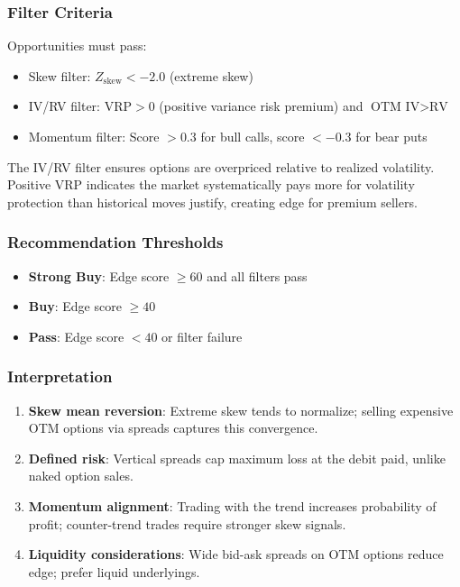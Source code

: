 \subsubsection{Filter Criteria}

Opportunities must pass:
\begin{itemize}
  \item Skew filter: $Z_{\text{skew}} < -2.0$ (extreme skew)
  \item IV/RV filter: $\text{VRP} > 0$ (positive variance risk premium) and $\text{OTM IV} > \text{RV}$
  \item Momentum filter: Score $> 0.3$ for bull calls, score $< -0.3$ for bear puts
\end{itemize}

The IV/RV filter ensures options are overpriced relative to realized volatility. Positive VRP indicates the market systematically pays more for volatility protection than historical moves justify, creating edge for premium sellers.

\subsubsection{Recommendation Thresholds}

\begin{itemize}
  \item \textbf{Strong Buy}: Edge score $\geq 60$ and all filters pass
  \item \textbf{Buy}: Edge score $\geq 40$
  \item \textbf{Pass}: Edge score $< 40$ or filter failure
\end{itemize}

\subsubsection{Interpretation}

\begin{enumerate}
  \item \textbf{Skew mean reversion}: Extreme skew tends to normalize; selling expensive OTM options via spreads captures this convergence.

  \item \textbf{Defined risk}: Vertical spreads cap maximum loss at the debit paid, unlike naked option sales.

  \item \textbf{Momentum alignment}: Trading with the trend increases probability of profit; counter-trend trades require stronger skew signals.

  \item \textbf{Liquidity considerations}: Wide bid-ask spreads on OTM options reduce edge; prefer liquid underlyings.
\end{enumerate}

